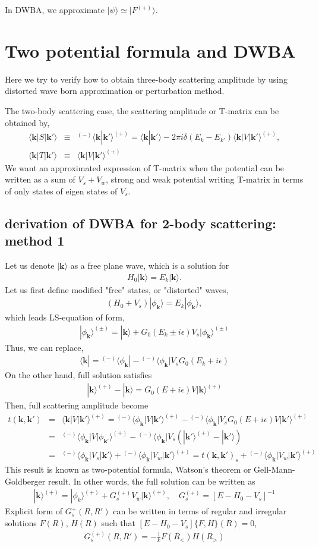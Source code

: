 \documentclass[10pt]{article}
\def\bm{\boldsymbol}
\newcommand{\bea}{\begin{eqnarray}}
\newcommand{\eea}{\end{eqnarray}}
\newcommand{\no}{\nonumber \\}
\def\vk{{\bm k}}
\def\la{\langle}
\def\ra{\rangle}
\begin{document}
In DWBA, we approximate $|\psi\ra\simeq |F^{(+)}\ra $.

\section{Two potential formula and DWBA}
Here we try to verify how to obtain three-body 
scattering amplitude by using 
distorted wave born approximation or perturbation method.

The two-body scattering case, the scattering amplitude or
T-matrix can be obtained by,
\bea
\la \vk|S|\vk'\ra&\equiv&{}^{(-)}\la \vk|\vk'\ra^{(+)}
=\la \vk|\vk'\ra-2\pi i\delta(E_k-E_{k'})\la \vk|V|\vk'\ra^{(+)},\no
\la \vk|T|\vk'\ra&\equiv& \la \vk|V|\vk'\ra^{(+)}
\eea
We want an approximated expression of T-matrix when the
potential can be written as a sum of $V_{s}+V_{w}$,
strong and weak potential writing T-matrix in terms of only 
states of eigen states of $V_{s}$.

\subsection{derivation of DWBA for 2-body scattering: method 1}
Let us denote $|\vk\ra$ as a free plane wave, which is a solution for
\bea 
H_0|\vk\ra=E_k|\vk\ra. 
\eea 
Let us first define modified "free" states, or "distorted" waves, 
\bea
(H_0+V_{s})|\phi_{\vk}\ra=E_{k}|\phi_{\vk}\ra,
\eea
which leads LS-equation of form,
\bea
|\phi_\vk\ra^{(\pm)}
=|\vk\ra+G_0(E_k \pm i\epsilon) V_{s}|\phi_\vk\ra^{(\pm)}
\eea
Thus, we can replace,
\bea
\la \vk|={}^{(-)}\la\phi_\vk|
      -{}^{(-)}\la\phi_\vk| V_s G_0(E_k +i\epsilon)
\eea    
On the other hand, full solution satisfies
\bea
|\vk\ra^{(+)}-|\vk\ra=G_0(E+i\epsilon) V|\vk\ra^{(+)}
\eea
Then, full scattering amplitude become
\bea
t(\vk,\vk')&=&\la \vk|V|\vk'\ra^{(+)}
={}^{(-)}\la \phi_\vk|V|\vk'\ra^{(+)}
 -{}^{(-)}\la \phi_\vk| V_s G_0(E+i\epsilon) V|\vk'\ra^{(+)}\no
&=&{}^{(-)}\la \phi_\vk|V|\phi_{\vk'}\ra^{(+)}
 -{}^{(-)}\la \phi_\vk| V_s (|\vk'\ra^{(+)}-|\vk'\ra)\no
&=&{}^{(-)}\la \phi_\vk| V_s |\vk'\ra
 +{}^{(-)}\la \phi_\vk| V_w|\vk'\ra^{(+)}   
=t(\vk,\vk')_s+{}^{(-)}\la \phi_\vk| V_w|\vk'\ra^{(+)}
\eea
This result is known as two-potential formula, Watson's theorem or
Gell-Mann-Goldberger result. In other words, the full solution can be written as
\bea 
|\vk\ra^{(+)}=|\phi_k\ra^{(+)}+G_s^{(+)} V_w|\vk\ra^{(+)},\quad
G_s^{(+)}=[E-H_0-V_s]^{-1}
\eea 
Explicit form of $G_s^{+}(R,R')$ can be written in terms of 
regular and irregular solutions $F(R)$, $H(R)$ such that 
$[E-H_0-V_s]\{F,H\}(R)=0$,
\bea 
G_{s}^{(+)}(R,R')=-\frac{1}{k} F(R_{<})H(R_{>})
\eea 
\end{document}
